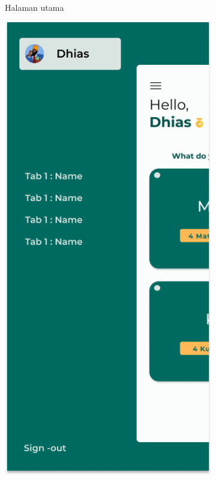\begin{figure}[H]
\begin{subfigure}[b]{0.23\textwidth}
	  \caption{Halaman utama}
	  \label{fig:HasilMainDash}
	\end{subfigure}
	\begin{subfigure}[b]{0.23\textwidth}
		\centering
	  \includegraphics[width=\linewidth]{contents/chapter-3/images/HF-Drawer.png}

\end{subfigure}
\end{figure}
